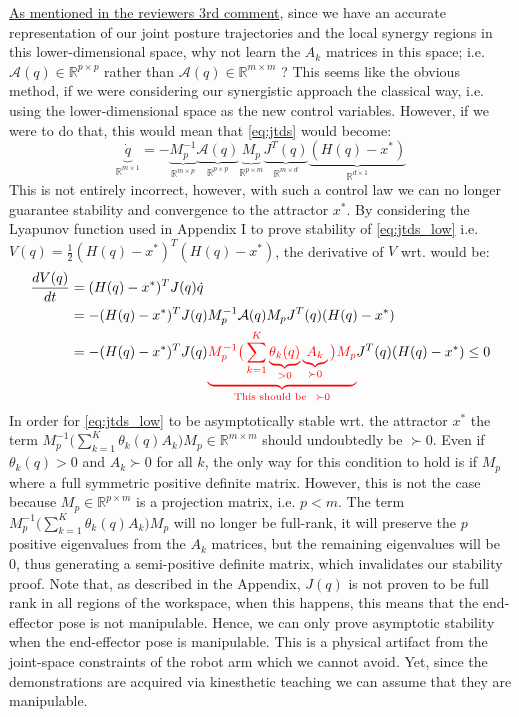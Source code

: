 \documentclass{article}
\begin{document}
\begin{enumerate}
\underline{As mentioned in the reviewers 3rd comment}, since we have an accurate representation of our joint posture trajectories and the local synergy regions in this lower-dimensional space, why not learn the $A_k$ matrices in this space; i.e. $\mathcal{A}(q)\in \mathbb{R}^{p\times p}$ rather than $\mathcal{A}(q)\in \mathbb{R}^{m\times m}$ ? This seems like the obvious method, if we were considering our synergistic approach the classical way, i.e. using the lower-dimensional space as the new control variables. However, if we were to do that, this would mean that \eqref{eq:jtds} would become:
\begin{equation}
\underbrace{\dot{q}}_{\mathbb{R}^{m\times 1}} = -\underbrace{M_p^{-1}}_{\mathbb{R}^{m\times p}}\underbrace{\mathcal{A}(q)}_{\mathbb{R}^{p\times p}}\underbrace{M_p}_{\mathbb{R}^{p\times m}}\underbrace{J^{T}(q)}_{\mathbb{R}^{m\times d}}\underbrace{(H(q)-x^*)}_{\mathbb{R}^{d\times 1}}
\label{eq:jtds_low}
\end{equation}
This is not entirely incorrect, however, with such a control law we can no longer guarantee stability and convergence to the attractor $x^{*}$. By considering the Lyapunov function used in Appendix I to prove stability of \eqref{eq:jtds_low} i.e. $V(q) = \frac{1}{2}(H(q) - x^*)^T(H(q) - x^*)$, the derivative of $ V $ wrt. would be:
\begin{equation}
\begin{aligned}
\frac{dV(q)}{dt} &= (H(q) - x^*)^TJ(q)\dot{q}\\
&= -(H(q) - x^*)^TJ(q)M_p^{-1}\mathcal{A}(q)M_pJ^T(q)(H(q) - x^*)\\
&= -(H(q) - x^*)^TJ(q)\textcolor{red}{\underbrace{M_p^{-1}\big(\sum_{k=1}^{K}\underbrace{\theta_k(q)}_{> 0}\underbrace{A_k}_{\succ 0}\big)M_p}_{\text{This should be}~~ \succ 0}}J^T(q)(H(q) - x^*)\leq 0
\end{aligned}
\end{equation}
In order for \eqref{eq:jtds_low} to be asymptotically stable wrt. the attractor $x^*$ the term $M_p^{-1}\big(\sum_{k=1}^{K}\theta_k(q)A_k\big)M_p \in \mathbb{R}^{m\times m}$ should undoubtedly be $\succ 0$. Even if $\theta_k(q) > 0$ and $A_k \succ 0$ for all $k$, the only way for this condition to hold is if $M_p$ where a full symmetric positive definite matrix. However, this is not the case because $M_p\in \mathbb{R}^{p\times m}$  is a projection matrix, i.e. $p<m$. The term $M_p^{-1}\big(\sum_{k=1}^{K}\theta_k(q)A_k\big)M_p$ will no longer be full-rank, it will preserve the $p$ positive eigenvalues from the $A_k$ matrices, but the remaining eigenvalues will be 0, thus generating a semi-positive definite matrix, which invalidates our stability proof. Note that, as described in the Appendix, $J(q)$ is not proven to be full rank in all regions of the workspace, when this happens, this means that the end-effector pose is not manipulable. Hence, we can only prove asymptotic stability when the end-effector pose is manipulable. This is a physical artifact from the joint-space constraints of the robot arm which we cannot avoid. Yet, since the demonstrations are acquired via kinesthetic teaching we can assume that they are manipulable. \\


\end{enumerate}
\end{document}
